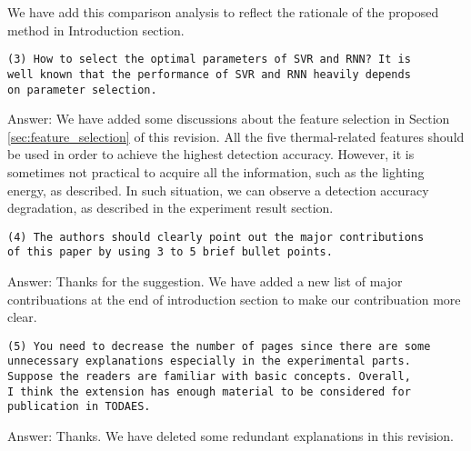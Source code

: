 We have add this comparison analysis to reflect the rationale of the
proposed method in Introduction section.

\begin{verbatim}
(3) How to select the optimal parameters of SVR and RNN? It is
well known that the performance of SVR and RNN heavily depends
on parameter selection.
\end{verbatim}

Answer: We have added some discussions about the feature selection in
Section \ref{sec:feature_selection} of this revision. All the five thermal-related
features should be used in order to achieve the highest detection accuracy.
However, it is sometimes not practical to acquire all the information,
such as the lighting energy, as described. In such situation, we can
observe a detection accuracy degradation, as described
in the experiment result section.




\begin{verbatim}
(4) The authors should clearly point out the major contributions
of this paper by using 3 to 5 brief bullet points.
\end{verbatim}

Answer: Thanks for the suggestion. We have added a new list of major
contribuations at the end of introduction section to make our
contribuation more clear.


\begin{verbatim}
(5) You need to decrease the number of pages since there are some
unnecessary explanations especially in the experimental parts.
Suppose the readers are familiar with basic concepts. Overall,
I think the extension has enough material to be considered for
publication in TODAES.
\end{verbatim}

Answer: Thanks. We have deleted some redundant explanations in this revision.
